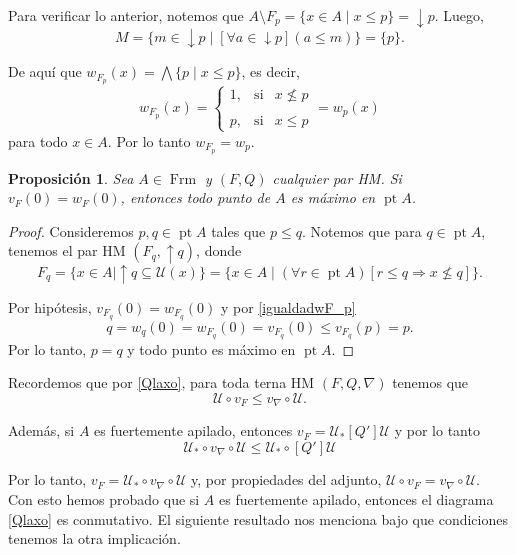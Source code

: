 \documentclass[11pt]{amsart}
\DeclareMathOperator{\pt}{pt}
\DeclareMathOperator{\Frm}{Frm}
\theoremstyle{plain}
\newtheorem{prop}[thm]{Proposición}
\theoremstyle{definition}
\begin{document}
Para verificar lo anterior, notemos que $A\setminus F_p=\{x\in A\mid x\leq p\}=\downarrow p$. Luego,
\[
M=\{m\in \downarrow p\mid [\forall a\in \downarrow p](a\leq m)\}=\{p\}.
\]

De aquí que $w_{F_p}(x)=\bigwedge\{p\mid x\leq p\}$, es decir, 
\begin{equation}\label{igualdadwF_p}
w_{F_p}(x)= \left\{ \begin{array}{lcc} 1, & \text{si}  &  x\nleq p\\ \\ 
	p, & \text{si} & x\leq p 
\end{array} \right.=w_p(x)
\end{equation}
para todo $x\in A$. Por lo tanto $w_{F_p}=w_p$.\\

\begin{prop}\label{maximosenpt}
Sea $A\in \Frm$ y $(F, Q)$ cualquier par HM. Si $v_F(0)=w_F(0)$, entonces todo punto de $A$ es máximo en $\pt A$.
\end{prop}

\begin{proof}
Consideremos $p,q\in \pt A$ tales que $p\leq q$. Notemos que para $q\in \pt A$, tenemos el par HM $(F_q, \uparrow q)$, donde 
\[
F_q=\{x\in A\mid \uparrow q\subseteq \mathcal{U}(x)\}=\{x\in A\mid (\forall r\in \pt A)[r\leq q\Rightarrow x\nleq q]\}.
\]

Por hipótesis, $v_{F_q}(0)=w_{F_q}(0)$ y por \eqref{igualdadwF_p}
\[
q=w_q(0)=w_{F_q}(0)=v_{F_q}(0)\leq v_{F_q}(p)=p.
\]
Por lo tanto, $p=q$ y todo punto es máximo en $\pt A$.
\end{proof}

Recordemos que por \eqref{Qlaxo}, para toda terna HM $(F, Q, \nabla)$ tenemos que 
\[
\mathcal{U}\circ v_F\leq v_\nabla \circ \mathcal{U}. 
\]

Además, si $A$ es fuertemente apilado, entonces $v_F=\mathcal{U}_*[Q']\mathcal{U}$ y por lo tanto
\[
\mathcal{U}_*\circ v_\nabla\circ \mathcal{U}\leq \mathcal{U}_*\circ [Q']\mathcal{U}
\]

Por lo tanto, $v_F=\mathcal{U}_*\circ v_\nabla\circ \mathcal{U}$ y, por propiedades del adjunto, $\mathcal{U}\circ v_F=v_\nabla\circ \mathcal{U}$.\\
	
Con esto hemos probado que si $A$ es fuertemente apilado, entonces el diagrama \eqref{Qlaxo} es conmutativo. El siguiente resultado nos menciona 
bajo que condiciones tenemos la otra implicación.
\end{document}
